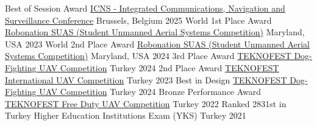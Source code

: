 


\begin{cvhonors}

  \cvhonor
    {\small Best of Session Award} %
    {\href{https://i-cns.org/}{\underline{ICNS} - Integrated Communications, Navigation and Surveillance Conference}} %
    {Brussels, Belgium} %
    {2025} %
  \cvhonor
    {\small World 1st Place Award} %
    {\href{https://suas-competition.org/}{\underline{Robonation SUAS} (Student Unmanned Aerial Systems Competition)}} %
    {Maryland, USA} %
    {2023} %
  \cvhonor
    {\small World 2nd Place Award} %
    {\href{https://suas-competition.org/}{\underline{Robonation SUAS} (Student Unmanned Aerial Systems Competition)}} %
    {Maryland, USA} %
    {2024} %
  \cvhonor
    {\small 3rd Place Award} %
    {\href{https://www.teknofest.org/tr/}{\underline{TEKNOFEST} Dog-Fighting UAV Competition}} %
    {Turkey} %
    {2024} %
  \cvhonor
    {\small 2nd Place Award} %
    {\href{https://www.teknofest.org/tr/}{\underline{TEKNOFEST} International UAV Competition}} %
    {Turkey} %
    {2023} %
  \cvhonor
    {\small Best in Design} %
    {\href{https://www.teknofest.org/tr/}{\underline{TEKNOFEST} Dog-Fighting UAV Competition}} %
    {Turkey} %
    {2024} %
  \cvhonor
    {\small Bronze Performance Award} %
    {\href{https://www.teknofest.org/tr/}{\underline{TEKNOFEST} Free Duty UAV Competition}} %
    {Turkey} %
    {2022} %
  \cvhonor
    {\small Ranked 2831st in Turkey} %
    {Higher Education Institutions Exam (YKS)} %
    {Turkey} %
    {2021} %

\end{cvhonors}
